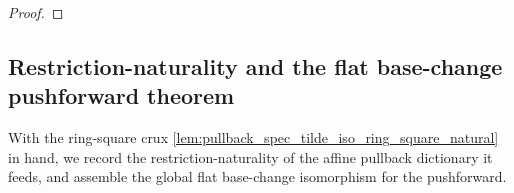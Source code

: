 \begin{lemma}
\begin{proof}
  \end{proof}
\end{lemma}

\subsection{Restriction-naturality and the flat base-change pushforward theorem}

With the ring-square crux \cref{lem:pullback_spec_tilde_iso_ring_square_natural} in hand, we record
the restriction-naturality of the affine pullback dictionary it feeds, and assemble the global flat
base-change isomorphism for the pushforward.

